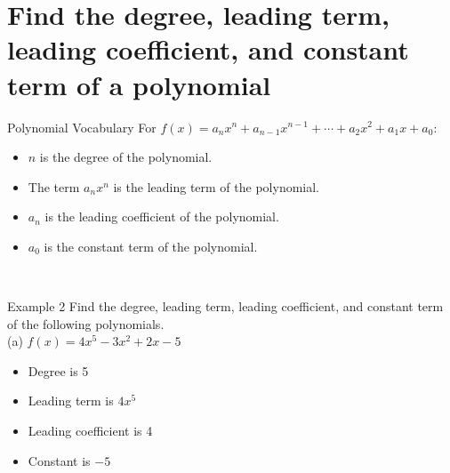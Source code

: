 \documentclass[t,usenames,dvipsnames]{beamer}
\begin{document}
\section{Find the degree, leading term, leading coefficient, and constant term of a polynomial}

\begin{frame}{Polynomial Vocabulary}
    For $f(x) = a_nx^n + a_{n-1}x^{n-1} + \cdots + a_2x^2 + a_1x + a_0$:    \newline\\
    \begin{itemize}
        \item<+-> $n$ is the \alert{degree} of the polynomial. \newline\\
        \item<+-> The term $a_nx^n$ is the \alert{leading term} of the polynomial.    \newline\\
        \item<+-> $a_n$ is the \alert{leading coefficient} of the polynomial.  \newline\\
        \item<+-> $a_0$ is the \alert{constant term} of the polynomial. \newline\\
    \end{itemize}
     \newline\\
\end{frame}

\begin{frame}{Example 2}
Find the degree, leading term, leading coefficient, and constant term of the following polynomials. \newline\\
(a) \quad $f(x) = 4x^5 - 3x^2 + 2x - 5$ \newline\\  \pause
\begin{itemize}
    \item<+-> Degree is 5 \newline\\
    \item<+-> Leading term is $4x^5$ \newline\\
    \item<+-> Leading coefficient is 4 \newline\\
    \item<+-> Constant is $-5$
\end{itemize}
\end{frame}
\end{document}
